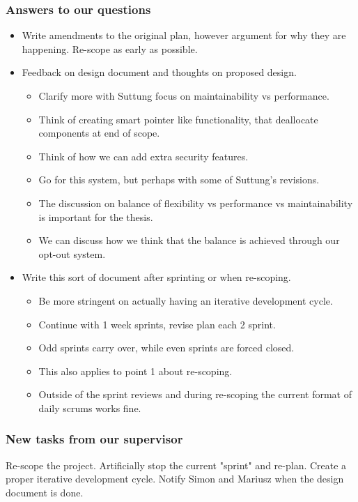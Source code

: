\documentclass[hidelinks]{article}
\begin{document}
\subsubsection*{Answers to our questions}
\begin{itemize}
    \item
    Write amendments to the original plan, however argument for why they are happening.
    Re-scope as early as possible.

    \item
    Feedback on design document and thoughts on proposed design. 
    \begin{itemize}
        \item
        Clarify more with Suttung focus on maintainability vs performance.
    
        \item
        Think of creating smart pointer like functionality, that deallocate components at end of scope.
    
        \item
        Think of how we can add extra security features. 
    
        \item
        Go for this system, but perhaps with some of Suttung's revisions. 
    
        \item
        The discussion on balance of flexibility vs performance vs maintainability is important for the thesis.
    
        \item
        We can discuss how we think that the balance is achieved through our opt-out system.
    \end{itemize}

    \item
    Write this sort of document after sprinting or when re-scoping.
    \begin{itemize}
        \item
        Be more stringent on actually having an iterative development cycle.
    
        \item
        Continue with 1 week sprints, revise plan each 2 sprint.
    
        \item
        Odd sprints carry over, while even sprints are forced closed.
    
        \item
        This also applies to point 1 about re-scoping.
    
        \item
        Outside of the sprint reviews and during re-scoping the current format of daily scrums works fine.
    \end{itemize}
\end{itemize}


\subsubsection*{New tasks from our supervisor}
Re-scope the project. Artificially stop the current "sprint" and re-plan.
Create a proper iterative development cycle.
Notify Simon and Mariusz when the design document is done.
\end{document}
